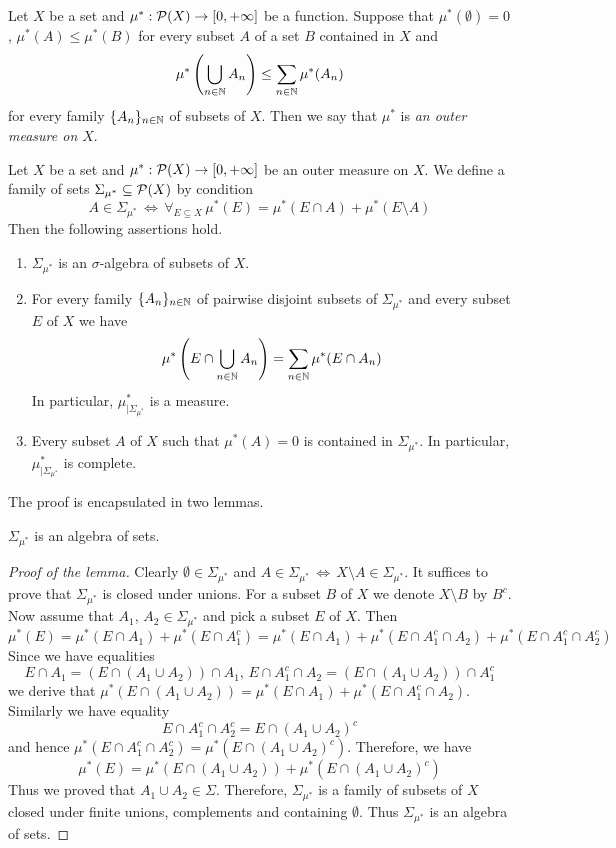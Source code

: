 \begin{definition}
Let $X$ be a set and $\mu^*:{\mathcal P}(X)\rightarrow [0,+\infty]$ be a function. Suppose that $\mu^*(\emptyset)=0$, $\mu^*(A)\leq \mu^*(B)$ for every subset $A$ of a set $B$ contained in $X$ and 
$$\mu^*\left(\bigcup_{n\in {\mathbb N}}A_n\right)\leq \sum_{n\in {\mathbb N}}\mu^*(A_n)$$ 
for every family  $\{A_n\}_{n\in {\mathbb N}}$ of subsets of $X$. Then we say that $\mu^*$ is \textit{an outer measure on $X$}.
\end{definition}

\begin{theorem}\label{theorem:carath{\'e}odoryconstruction}
Let $X$ be a set and $\mu^*:{\mathcal P}(X)\rightarrow [0,+\infty]$ be an outer measure on $X$. We define a family of sets $\Sigma_{\mu^*}\subseteq {\mathcal P}(X)$ by condition
$$A\in \Sigma_{\mu^*}\,\Leftrightarrow\,\forall_{E\subseteq X}\,\mu^*(E)=\mu^*(E\cap A)+\mu^*(E\setminus A)$$
Then the following assertions hold.
\begin{enumerate}[label=\emph{\textbf{(\arabic*)}}, leftmargin=*]
\item $\Sigma_{\mu^*}$ is an $\sigma$-algebra of subsets of $X$.
\item For every family $\{A_n\}_{n\in {\mathbb N}}$ of pairwise disjoint subsets of $\Sigma_{\mu^*}$ and every subset $E$ of $X$ we have
$$\mu^*\left(E\cap \bigcup_{n\in {\mathbb N}}A_n\right)=\sum_{n\in {\mathbb N}}\mu^*(E\cap A_n)$$
In particular, $\mu^*_{\mid \Sigma_{\mu^*}}$ is a measure.
\item Every subset $A$ of $X$ such that $\mu^*(A)=0$ is contained in $\Sigma_{\mu^*}$. In particular, $\mu^*_{\mid \Sigma_{\mu^*}}$ is complete.
\end{enumerate}
\end{theorem}
\noindent
The proof is encapsulated in two lemmas.

\begin{lemma}\label{lemma:outeralgebra}
$\Sigma_{\mu^*}$ is an algebra of sets.
\end{lemma}
\begin{proof}[Proof of the lemma]
Clearly $\emptyset \in \Sigma_{\mu^*}$ and $A\in \Sigma_{\mu^*}\,\Leftrightarrow\,X\setminus A\in \Sigma_{\mu^*}$. It suffices to prove that $\Sigma_{\mu^*}$ is closed under unions. For a subset $B$ of $X$ we denote $X\setminus B$ by $B^c$. Now assume that $A_1$, $A_2\in \Sigma_{\mu^*}$ and pick a subset $E$ of $X$. Then
$$\mu^*(E)=\mu^*(E\cap A_1)+\mu^*(E\cap A_1^c)=\mu^*(E\cap A_1)+\mu^*(E\cap A_1^c\cap A_2)+\mu^*(E\cap A_1^c\cap A_2^c)$$
Since we have equalities
$$E\cap A_1=\left(E\cap (A_1\cup A_2)\right)\cap A_1,\,E\cap A_1^c\cap A_2=\left(E\cap (A_1\cup A_2)\right)\cap A_1^c$$
we derive that $\mu^*(E\cap (A_1\cup A_2))=\mu^*(E\cap A_1)+\mu^*(E\cap A_1^c\cap A_2)$. Similarly we have equality 
$$E\cap A_1^c\cap A_2^c=E\cap (A_1\cup A_2)^c$$
and hence $\mu^*(E\cap A_1^c\cap A_2^c)=\mu^*(E\cap (A_1\cup A_2)^c)$. Therefore, we have 
$$\mu^*(E)=\mu^*(E\cap (A_1\cup A_2))+\mu^*(E\cap (A_1\cup A_2)^c)$$
Thus we proved that $A_1\cup A_2\in \Sigma$. Therefore, $\Sigma_{\mu^*}$ is a family of subsets of $X$ closed under finite unions, complements and containing $\emptyset$. Thus $\Sigma_{\mu^*}$ is an algebra of sets.
\end{proof}

